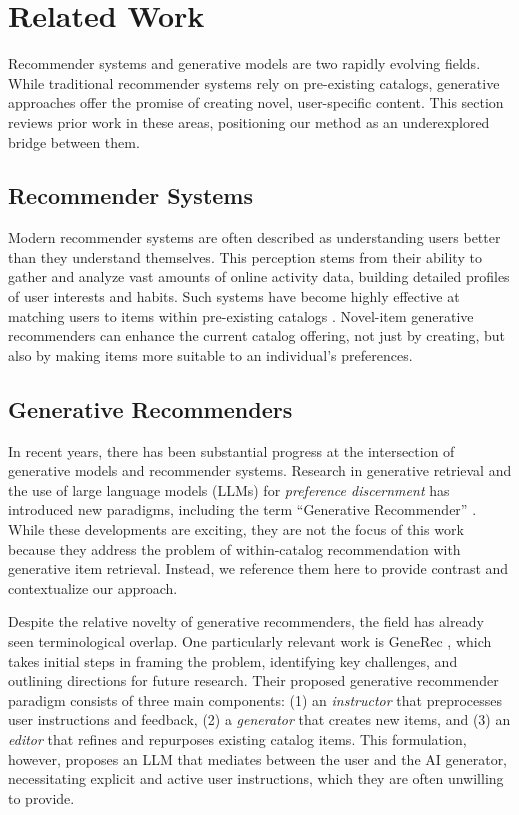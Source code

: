 \section{Related Work}
Recommender systems and generative models are two rapidly evolving fields. While traditional recommender systems rely on pre-existing catalogs, generative approaches offer the promise of creating novel, user-specific content. This section reviews prior work in these areas, positioning our method as an underexplored bridge between them.


\subsection{Recommender Systems}
Modern recommender systems are often described as understanding users better than they understand themselves. This perception stems from their ability to gather and analyze vast amounts of online activity data, building detailed profiles of user interests and habits. Such systems have become highly effective at matching users to items within pre-existing catalogs \cite{castells2023recommendersystemsprimer, li2023recentdevelopmentsrecommendersystems}.  Novel-item generative recommenders can enhance the current catalog offering, not just by creating, but also by making items more suitable to an individual's preferences.

\subsection{Generative Recommenders}
In recent years, there has been substantial progress at the intersection of generative models and recommender systems. Research in generative retrieval \cite{zhai2024actionsspeaklouderwords} and the use of large language models (LLMs) for \textit{preference discernment} \cite{paischer2024preferencediscerningllmenhancedgenerative} has introduced new paradigms, including the term ``Generative Recommender'' \cite{zhai2024actionsspeaklouderwords}. While these developments are exciting, they are not the focus of this work because they address the problem of within-catalog recommendation with generative item retrieval. Instead, we reference them here to provide contrast and contextualize our approach.

Despite the relative novelty of generative recommenders, the field has already seen terminological overlap. One particularly relevant work is GeneRec \cite{wang2024generativerecommendationnextgenerationrecommender}, which takes initial steps in framing the problem, identifying key challenges, and outlining directions for future research. Their proposed generative recommender paradigm consists of three main components: (1) an \textit{instructor} that preprocesses user instructions and feedback, (2) a \textit{generator} that creates new items, and (3) an \textit{editor} that refines and repurposes existing catalog items. This formulation, however, proposes an LLM that mediates between the user and the AI generator, necessitating explicit and active user instructions, which they are often unwilling to provide.

